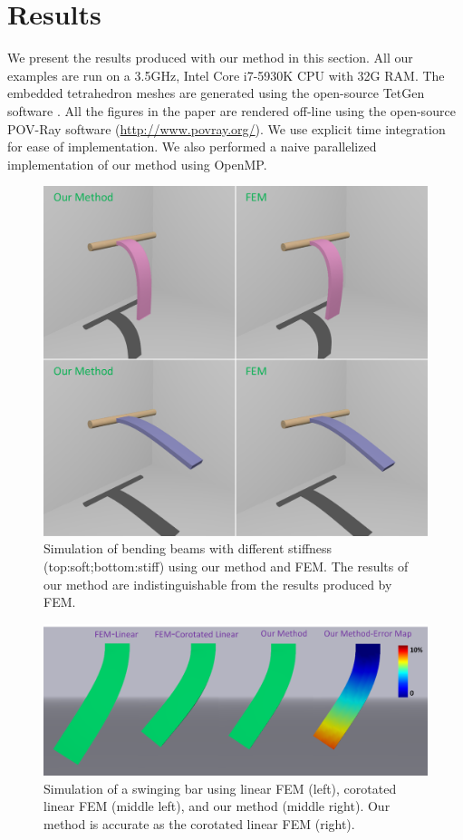 \section{Results}
We present the results produced with our method in this section. All our examples are run on a 3.5GHz, Intel Core i7-5930K CPU with 32G RAM. The embedded tetrahedron meshes are generated using the open-source TetGen software \cite{Si:2015:TDQ:2732672.2629697}. All the figures in the paper are rendered off-line using the open-source POV-Ray software (\url{http://www.povray.org/}). We use explicit time integration for ease of implementation. We also performed a naive parallelized implementation of our method using OpenMP.

\begin{figure}[t]
  \centering
  \includegraphics[width=\linewidth]{../figs/demo_strip_vs_fem.png}
  \caption{\label{fig:9}
  Simulation of bending beams with different stiffness (top:soft;bottom:stiff) using our method and FEM. The results of our method are indistinguishable from the results produced by FEM.
}
\end{figure}
\begin{figure}[t]
  \centering
  \includegraphics[width=\linewidth]{../figs/revision/demo_bar_oscillate_vs_fem_2.png}
  \caption{\label{fig:10}
  Simulation of a swinging bar using linear FEM (left), corotated linear FEM (middle left), and our method (middle right). Our method is accurate as the corotated linear FEM (right).
}
\end{figure}
